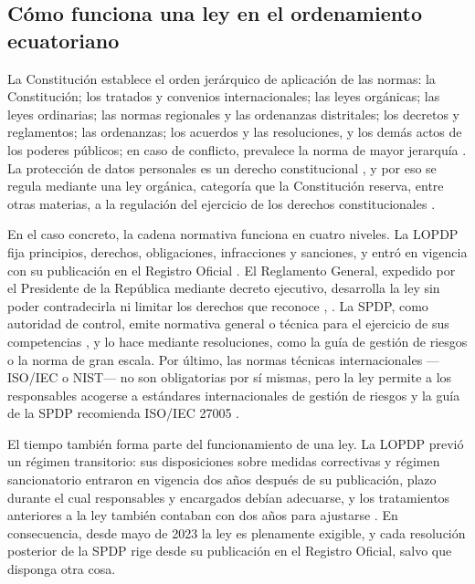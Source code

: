 \subsection{Cómo funciona una ley en el ordenamiento ecuatoriano}
\label{sec:como_funciona_ley}

La Constitución establece el orden jerárquico de aplicación de las normas: la Constitución; los tratados y convenios internacionales; las leyes orgánicas; las leyes ordinarias; las normas regionales y las ordenanzas distritales; los decretos y reglamentos; las ordenanzas; los acuerdos y las resoluciones, y los demás actos de los poderes públicos; en caso de conflicto, prevalece la norma de mayor jerarquía \cite[art.~425]{constitucion2008}. La protección de datos personales es un derecho constitucional \cite[art.~66, num.~19]{constitucion2008}, y por eso se regula mediante una ley orgánica, categoría que la Constitución reserva, entre otras materias, a la regulación del ejercicio de los derechos constitucionales \cite[art.~133]{constitucion2008}.

En el caso concreto, la cadena normativa funciona en cuatro niveles. La LOPDP fija principios, derechos, obligaciones, infracciones y sanciones, y entró en vigencia con su publicación en el Registro Oficial \cite[disposición final]{lopdp2021}. El Reglamento General, expedido por el Presidente de la República mediante decreto ejecutivo, desarrolla la ley sin poder contradecirla ni limitar los derechos que reconoce \cite[art.~6]{lopdp2021}, \cite{rlopdp2023}. La SPDP, como autoridad de control, emite normativa general o técnica para el ejercicio de sus competencias \cite[art.~76, num.~5]{lopdp2021}, y lo hace mediante resoluciones, como la guía de gestión de riesgos o la norma de gran escala. Por último, las normas técnicas internacionales ---ISO/IEC o NIST--- no son obligatorias por sí mismas, pero la ley permite a los responsables acogerse a estándares internacionales de gestión de riesgos \cite[art.~37]{lopdp2021} y la guía de la SPDP recomienda ISO/IEC 27005 \cite{spdp2026guiav2}.

El tiempo también forma parte del funcionamiento de una ley. La LOPDP previó un régimen transitorio: sus disposiciones sobre medidas correctivas y régimen sancionatorio entraron en vigencia dos años después de su publicación, plazo durante el cual responsables y encargados debían adecuarse, y los tratamientos anteriores a la ley también contaban con dos años para ajustarse \cite[disposiciones transitorias primera y segunda]{lopdp2021}. En consecuencia, desde mayo de 2023 la ley es plenamente exigible, y cada resolución posterior de la SPDP rige desde su publicación en el Registro Oficial, salvo que disponga otra cosa.

